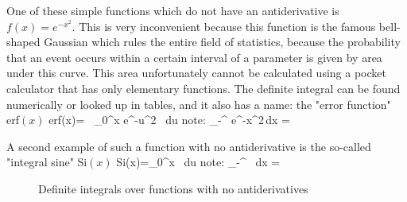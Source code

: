 One of these simple functions which do not have an antiderivative is $f(x)=e^{-x^2}$. This 
is very inconvenient because this function is the famous bell-shaped Gaussian which rules the
entire field of statistics, because the probability that an event occurs within a certain interval
of a parameter is given by area under this curve. This area unfortunately cannot be calculated
using a pocket calculator that has only elementary functions. The definite integral can be 
found numerically or looked up in tables, and it also has a name: the "error function" erf$(x)$
\bnn  
\mbox{erf}(x)= \, \int_0^x e^{-u^2} \, du  \qquad\qquad \mbox{note:}\qquad
\int_{-\infty}^{\infty} e^{-x^2}\,dx = \sqrt{\pi}
\enn  \svs

A second example of such a function with no antiderivative is the so-called "integral sine" Si$(x)$
\bnn 
\mbox{Si}(x)=\int_0^x  \, du  \qquad\qquad \mbox{note:}\qquad
\int_{-\infty}^{\infty}  \, dx = \pi
\enn  
\begin{figure}[t]
    \centerline{
    \hspace*{0.5cm}
    } \svs 
    \caption{Definite integrals over functions with no antiderivatives}  \label{fig24}
\end{figure}







  